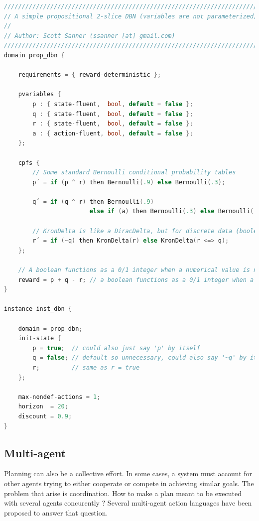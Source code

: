 \documentclass[11pt,a4paper,twoside,openright,titlepage,numbers=noenddot,headinclude,cleardoublepage=empty,openany]{scrreprt}
\theoremstyle{plain}
\theoremstyle{definition}
\theoremstyle{remark}
\begin{document}
\begin{lstlisting}[language={C++}, caption={Example of RDDL syntax by Sanner.}, escapechar={$}, label=lst:rddl]
////////////////////////////////////////////////////////////////////////
// A simple propositional 2-slice DBN (variables are not parameterized).
//
// Author: Scott Sanner (ssanner [at] gmail.com)
////////////////////////////////////////////////////////////////////////
domain prop_dbn {
    
    requirements = { reward-deterministic };
        
    pvariables { 
        p : { state-fluent,  bool, default = false };
        q : { state-fluent,  bool, default = false };
        r : { state-fluent,  bool, default = false }; 
        a : { action-fluent, bool, default = false }; 
    };
  
    cpfs {
        // Some standard Bernoulli conditional probability tables
        p´ = if (p ^ r) then Bernoulli(.9) else Bernoulli(.3);
                        
        q´ = if (q ^ r) then Bernoulli(.9) 
                        else if (a) then Bernoulli(.3) else Bernoulli(.8);

        // KronDelta is like a DiracDelta, but for discrete data (boolean or int)
        r´ = if (~q) then KronDelta(r) else KronDelta(r <=> q);                                     
    };

    // A boolean functions as a 0/1 integer when a numerical value is needed    
    reward = p + q - r; // a boolean functions as a 0/1 integer when a numerical value is needed
}
        
instance inst_dbn {

    domain = prop_dbn;  
    init-state { 
        p = true;  // could also just say 'p' by itself 
        q = false; // default so unnecessary, could also say '~q' by itself
        r;         // same as r = true
    };
  
    max-nondef-actions = 1;
    horizon  = 20;
    discount = 0.9;
}
\end{lstlisting}

\hypertarget{multi-agent}{%
\subsection{Multi-agent}\label{multi-agent}}

Planning can also be a collective effort. In some cases, a system must
account for other agents trying to either cooperate or compete in
achieving similar goals. The problem that arise is coordination. How to
make a plan meant to be executed with several agents concurently ?
Several multi-agent action languages have been proposed to answer that
question.
\end{document}
